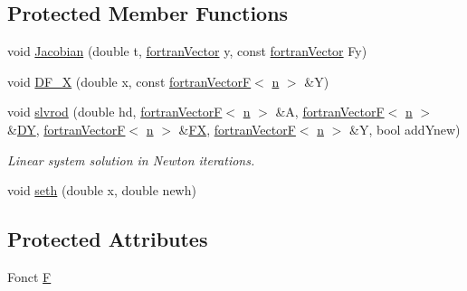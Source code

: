 \subsection*{Protected Member Functions}
\begin{DoxyCompactItemize}
\item 
void \hyperlink{classodes_1_1Rodascc_a12dc29bcc64f20137c98c952cd139ac3}{Jacobian} (double t, \hyperlink{classodes_1_1fortranVector}{fortran\-Vector} y, const \hyperlink{classodes_1_1fortranVector}{fortran\-Vector} Fy)
\item 
void \hyperlink{classodes_1_1Rodascc_ab1ed481ac3f2c0d3f220b12f8cfd49a4}{D\-F\-\_\-\-X} (double x, const \hyperlink{classodes_1_1fortranVectorF}{fortran\-Vector\-F}$<$ \hyperlink{classodes_1_1Rodascc_a7a4cb0d10f0154fed837031863bb491d}{n} $>$ \&Y)
\item 
void \hyperlink{classodes_1_1Rodascc_a57609b68daf3b308c93a88fab28e33dc}{slvrod} (double hd, \hyperlink{classodes_1_1fortranVectorF}{fortran\-Vector\-F}$<$ \hyperlink{classodes_1_1Rodascc_a7a4cb0d10f0154fed837031863bb491d}{n} $>$ \&A, \hyperlink{classodes_1_1fortranVectorF}{fortran\-Vector\-F}$<$ \hyperlink{classodes_1_1Rodascc_a7a4cb0d10f0154fed837031863bb491d}{n} $>$ \&\hyperlink{classodes_1_1Rodascc_af9ba770adeaa348e546d74683f91013a}{D\-Y}, \hyperlink{classodes_1_1fortranVectorF}{fortran\-Vector\-F}$<$ \hyperlink{classodes_1_1Rodascc_a7a4cb0d10f0154fed837031863bb491d}{n} $>$ \&\hyperlink{classodes_1_1Rodascc_abd4edcb40bf4b1dc38601c1d928e03ab}{F\-X}, \hyperlink{classodes_1_1fortranVectorF}{fortran\-Vector\-F}$<$ \hyperlink{classodes_1_1Rodascc_a7a4cb0d10f0154fed837031863bb491d}{n} $>$ \&Y, bool add\-Ynew)
\begin{DoxyCompactList}\small\item\em Linear system solution in Newton iterations. \end{DoxyCompactList}\item 
void \hyperlink{classodes_1_1Rodascc_acfaef50c7ab72b5d12097dfb73203adc}{seth} (double x, double newh)
\end{DoxyCompactItemize}
\subsection*{Protected Attributes}
\begin{DoxyCompactItemize}
\item 
Fonct \hyperlink{classodes_1_1Rodascc_a472412c50cb400ce985364fbbc027e47}{F}
\end{DoxyCompactItemize}

